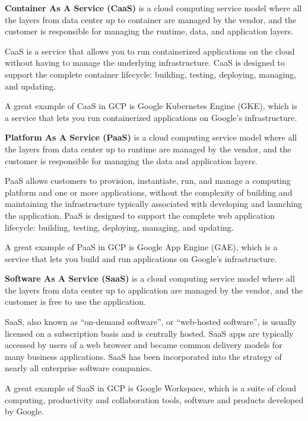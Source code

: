 \textbf{Container As A Service (CaaS)} is a cloud computing service model where all the layers from data center up to
container are managed by the vendor, and the customer is responsible for managing the runtime, data, and application
layers.
\ed

CaaS is a service that allows you to run containerized applications on the cloud without having to manage the underlying
infrastructure. CaaS is designed to support the complete container lifecycle: building, testing, deploying, managing,
and updating.

\be
A great example of CaaS in GCP is Google Kubernetes Engine (GKE), which is a service that lets you run containerized
applications on Google's infrastructure.
\ee

\textbf{Platform As A Service (PaaS)} is a cloud computing service model where all the layers from data center up to
runtime are managed by the vendor, and the customer is responsible for managing the data and application layers.
\ed

PaaS allows customers to provision, instantiate, run, and manage a computing platform and one or more applications,
without the complexity of building and maintaining the infrastructure typically associated with developing and launching
the application. PaaS is designed to support the complete web application lifecycle: building, testing, deploying,
managing, and updating.

\be
A great example of PaaS in GCP is Google App Engine (GAE), which is a service that lets you build and run applications
on Google's infrastructure.
\ee

\textbf{Software As A Service (SaaS)} is a cloud computing service model where all the layers from data center up to
application are managed by the vendor, and the customer is free to use the application.
\ed

SaaS, also known as ``on-demand software'', or ``web-hosted software'', is usually licensed on a subscription basis
and is centrally hosted. SaaS apps are typically accessed by users of a web browser and became common delivery models
for many business applications. SaaS has been incorporated into the strategy of nearly all enterprise software companies.

\be
A great example of SaaS in GCP is Google Workspace, which is a suite of cloud computing, productivity and collaboration
tools, software and products developed by Google.
\ee

